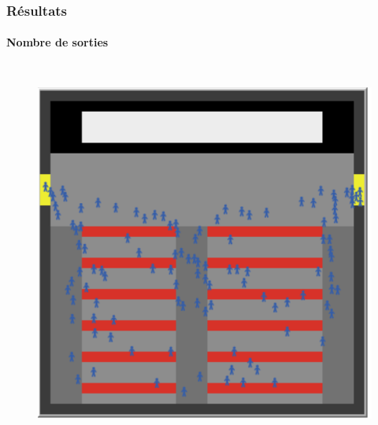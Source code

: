\documentclass[10pt]{beamer}
\begin{document}
\begin{frame}
	\frametitle{\textbf {\Large Résultats}}
	\framesubtitle{\normalsize Nombre de sorties}
		\begin{columns}

			\begin{figure}
				\includegraphics[width=\linewidth]{Capture_sortie.PNG}
 				\label{pic: sortie}
 			\end{figure}


\end{columns}
\end{frame}
\end{document}

